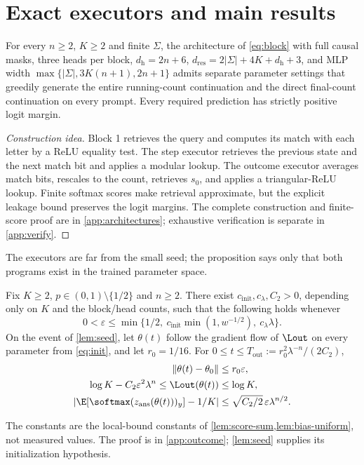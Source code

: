 \section{Exact executors and main results}\label{sec:results}
\begin{proposition}\label{prop:represent}
For every $n\ge2$, $K\ge2$ and finite $\Sigma$, the architecture of \cref{eq:block} with full causal masks, three heads per block, $d_{\mathrm h}=2n+6$, $d_{\mathrm{res}}=2|\Sigma|+4K+d_{\mathrm h}+3$, and MLP width $\max\{|\Sigma|,3K(n+1),2n+1\}$ admits separate parameter settings that greedily generate the entire running-count continuation and the direct final-count continuation on every prompt. Every required prediction has strictly positive logit margin.
\end{proposition}
\begin{proof}[Construction idea]
Block 1 retrieves the query and computes its match with each letter by a ReLU equality test. The step executor retrieves the previous state and the next match bit and applies a modular lookup. The outcome executor averages match bits, rescales to the count, retrieves $s_0$, and applies a triangular-ReLU lookup. Finite softmax scores make retrieval approximate, but the explicit leakage bound preserves the logit margins. The complete construction and finite-score proof are in \cref{app:architectures}; exhaustive verification is separate in \cref{app:verify}.
\end{proof}
The executors are far from the small seed; the proposition says only that both programs exist in the trained parameter space.

\begin{theorem}\label{thm:outcome}\label{thm:outcome-end}
Fix $K\ge2$, $p\in(0,1)\setminus\{1/2\}$ and $n\ge2$. There exist $c_{\mathrm{init}},c_\lambda,C_2>0$, depending only on $K$ and the block/head counts, such that the following holds whenever
\begin{equation}\label{eq:small}
0<\varepsilon\le\min\{1/2,\ c_{\mathrm{init}}\min(1,w^{-1/2}),\ c_\lambda\lambda\}.
\end{equation}
On the event of \cref{lem:seed}, let $\theta(t)$ follow the gradient flow of $\Lout$ on every parameter from \cref{eq:init}, and let $r_0=1/16$. For $0\le t\le T_{\mathrm{out}}:=r_0^2\lambda^{-n}/(2C_2)$,
\begin{align}
\|\theta(t)-\theta_0\|&\le r_0\varepsilon,\nonumber\\
\log K-C_2\varepsilon^2\lambda^n\le\Lout(\theta(t))&\le\log K,\label{eq:plateau}\\
\left|\E[\softmax(z_{\mathrm{ans}}(\theta(t)))_y]-1/K\right|&\le\sqrt{C_2/2}\,\varepsilon\lambda^{n/2}.\nonumber
\end{align}
\end{theorem}
The constants are the local-bound constants of \cref{lem:score-sum,lem:bias-uniform}, not measured values. The proof is in \cref{app:outcome}; \cref{lem:seed} supplies its initialization hypothesis.

